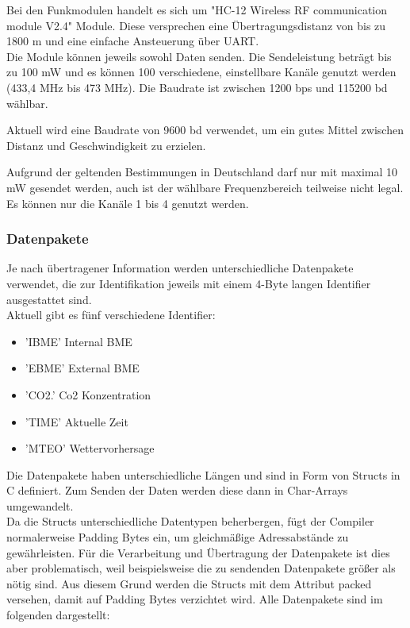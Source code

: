 \documentclass[a4paper,11pt]{article}
\begin{document}
Bei den Funkmodulen handelt es sich um "HC-12 Wireless RF communication module V2.4" Module. Diese versprechen eine Übertragungsdistanz von bis zu 1800 m
und eine einfache Ansteuerung über UART. \\
Die Module können jeweils sowohl Daten senden. 
Die Sendeleistung beträgt bis zu 100 mW und es können 100 verschiedene, einstellbare Kanäle genutzt werden (433,4 MHz bis 473 MHz). Die Baudrate ist zwischen 
1200 bps und 115200 bd wählbar. 

\vspace{0.2cm}
\noindent
Aktuell wird eine Baudrate von 9600 bd verwendet, um ein gutes Mittel zwischen Distanz und Geschwindigkeit zu erzielen. 

\vspace{0.5cm}
\noindent
Aufgrund der geltenden Bestimmungen in Deutschland darf nur mit maximal 10 mW gesendet werden, auch ist der wählbare Frequenzbereich teilweise nicht legal.
Es können nur die Kanäle 1 bis 4 genutzt werden. 

\subsubsection{Datenpakete}
\label{subsubsub:datenpakete}

Je nach übertragener Information werden unterschiedliche Datenpakete verwendet, die zur Identifikation jeweils mit einem 4-Byte langen Identifier ausgestattet sind. \\
Aktuell gibt es fünf verschiedene Identifier:
\begin{itemize}
  \item 'IBME' Internal BME
  \item 'EBME' External BME
  \item 'CO2.' Co2 Konzentration
  \item 'TIME' Aktuelle Zeit
  \item 'MTEO' Wettervorhersage
\end{itemize}

\noindent
Die Datenpakete haben unterschiedliche Längen und sind in Form von Structs in C definiert. Zum Senden der Daten werden diese dann in Char-Arrays umgewandelt. \\
Da die Structs unterschiedliche Datentypen beherbergen, fügt der Compiler normalerweise Padding Bytes ein, um gleichmäßige Adressabstände zu gewährleisten. 
Für die Verarbeitung und Übertragung der Datenpakete ist dies aber problematisch, weil beispielsweise die zu sendenden Datenpakete größer als nötig sind. 
Aus diesem Grund werden die Structs mit dem Attribut packed versehen, damit auf Padding Bytes verzichtet wird. 
Alle Datenpakete sind im folgenden dargestellt:
\end{document}
